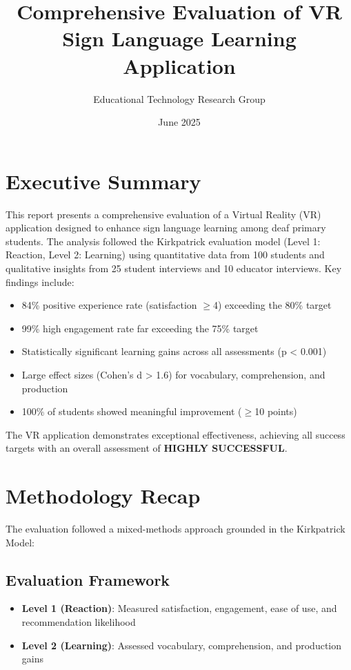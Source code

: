 \documentclass{article}
\title{Comprehensive Evaluation of VR Sign Language Learning Application}
\author{Educational Technology Research Group}
\date{June 2025}
\begin{document}
\maketitle

\section*{Executive Summary}
This report presents a comprehensive evaluation of a Virtual Reality (VR) application designed to enhance sign language learning among deaf primary students. The analysis followed the Kirkpatrick evaluation model (Level 1: Reaction, Level 2: Learning) using quantitative data from 100 students and qualitative insights from 25 student interviews and 10 educator interviews. Key findings include:
\begin{itemize}
    \item 84\% positive experience rate (satisfaction $\geq$4) exceeding the 80\% target
    \item 99\% high engagement rate far exceeding the 75\% target
    \item Statistically significant learning gains across all assessments (p < 0.001)
    \item Large effect sizes (Cohen's d > 1.6) for vocabulary, comprehension, and production
    \item 100\% of students showed meaningful improvement ($\geq$10 points)
\end{itemize}
The VR application demonstrates exceptional effectiveness, achieving all success targets with an overall assessment of \textbf{HIGHLY SUCCESSFUL}.

\section{Methodology Recap}
The evaluation followed a mixed-methods approach grounded in the Kirkpatrick Model:
\subsection{Evaluation Framework}
\begin{itemize}
    \item \textbf{Level 1 (Reaction)}: Measured satisfaction, engagement, ease of use, and recommendation likelihood
    \item \textbf{Level 2 (Learning)}: Assessed vocabulary, comprehension, and production gains
\end{itemize}
\end{document}
